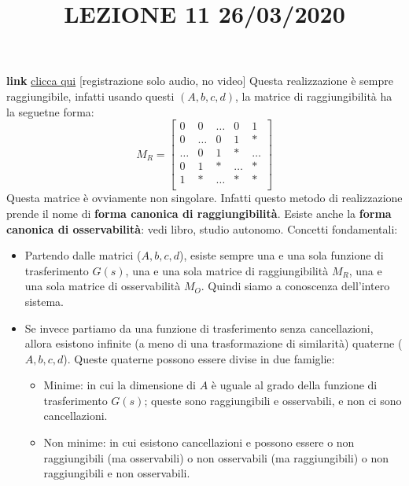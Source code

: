\newline
\newline
\title{LEZIONE 11 26/03/2020}\newline
\textbf{link} \href{https://web.microsoftstream.com/video/55dca95e-fe7f-4bf2-82e6-d3024939e5c3?list=user&userId=faa91214-a6f5-40d7-8875-253fd49b8ce1}{clicca qui} [registrazione solo audio, no video]\newline
\newline
Questa realizzazione è sempre raggiungibile, infatti usando questi $(A,b,c,d)$, la matrice di raggiungibilità ha la seguetne forma:
\[
    M_R = \left[\begin{matrix}
        0     & 0     & \dots & 0     & 1    \\
        0     & \dots & 0     & 1     & *    \\
        \dots & 0     & 1     & *     & \dots\\
        0     & 1     & *     & \dots & *    \\
        1     & *     & \dots & *     & *    \\
    \end{matrix}\right]
\]
Questa matrice è ovviamente non singolare.\newline
\newline
Infatti questo metodo di realizzazione prende il nome di \textbf{forma canonica di raggiungibilità}.\newline
\newline
Esiste anche la \textbf{forma canonica di osservabilità}: vedi libro, studio autonomo.\newline
\newline
Concetti fondamentali:
\begin{itemize}
    \item Partendo dalle matrici ($A,b,c,d$), esiste sempre una e una sola funzione di trasferimento $G(s)$, una e una sola matrice di raggiungibilità $M_R$, una e una sola matrice di osservabilità $M_O$. Quindi siamo a conoscenza dell'intero sistema.
    \item Se invece partiamo da una funzione di trasferimento senza cancellazioni, allora esistono infinite (a meno di una trasformazione di similarità) quaterne ($A,b,c,d$). Queste quaterne possono essere divise in due famiglie:
    \begin{itemize}
        \item Minime: in cui la dimensione di $A$ è uguale al grado della funzione di trasferimento $G(s)$; queste sono raggiungibili e osservabili, e non ci sono cancellazioni.
        \item Non minime: in cui esistono cancellazioni e possono essere o non raggiungibili (ma osservabili) o non osservabili (ma raggiungibili) o non raggiungibili e non osservabili.
    \end{itemize}
\end{itemize}
